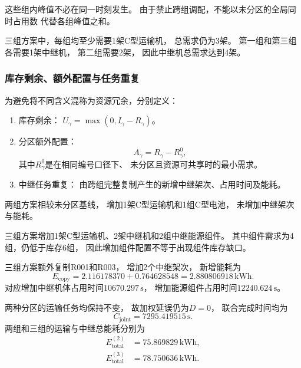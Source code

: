\documentclass[bwprint]{gmcmthesis}
\begin{document}
这些组内峰值不必在同一时刻发生。
由于禁止跨组调配，不能以未分区的全局同时占用数
代替各组峰值之和。

三组方案中，每组均至少需要1架C型运输机，
总需求仍为3架。
第一组和第三组各需要1架中继机，
第二组需要2架，
因此中继机总需求达到4架。

\subsubsection{库存剩余、额外配置与任务重复}

为避免将不同含义混称为资源冗余，分别定义：

\begin{enumerate}
    \item 库存剩余：
    $U_\gamma=\max(0,I_\gamma-R_\gamma)$。

    \item 分区额外配置：
    \begin{equation}
    A_\gamma=R_\gamma-R_\gamma^0,
    \end{equation}
    其中$R_\gamma^0$是在相同编号口径下、
    未分区且资源可共享时的最小需求。

    \item 中继任务重复：
    由跨组完整复制产生的新增中继架次、占用时间及能耗。
\end{enumerate}

两组方案相较未分区基线，
增加1架C型运输机和1组C型电池，
未增加中继架次与能耗。

三组方案增加1架C型运输机、2架中继机和2组中继能源组件。
其中组件需求为4组，仍低于库存6组，
因此增加组件配置不等于出现组件库存缺口。

三组方案额外复制R001和R003，
增加2个中继架次，
新增能耗为
\begin{equation}
E_{\mathrm{copy}}
=
2.116178370+0.764628548
=
2.880806918\,\mathrm{kWh}.
\end{equation}
对应增加中继机体占用时间$10670.297\,\mathrm{s}$，
增加能源组件占用时间$12240.624\,\mathrm{s}$。

两种分区的运输任务均保持不变，
故加权延误仍为$D=0$，
联合完成时间均为
\begin{equation}
C_{\mathrm{joint}}=7295.419515\,\mathrm{s}.
\end{equation}
两组和三组的运输与中继总能耗分别为
\begin{align}
E_{\mathrm{total}}^{(2)}
&=75.869829\,\mathrm{kWh},\\
E_{\mathrm{total}}^{(3)}
&=78.750636\,\mathrm{kWh}.
\end{align}
\end{document}

